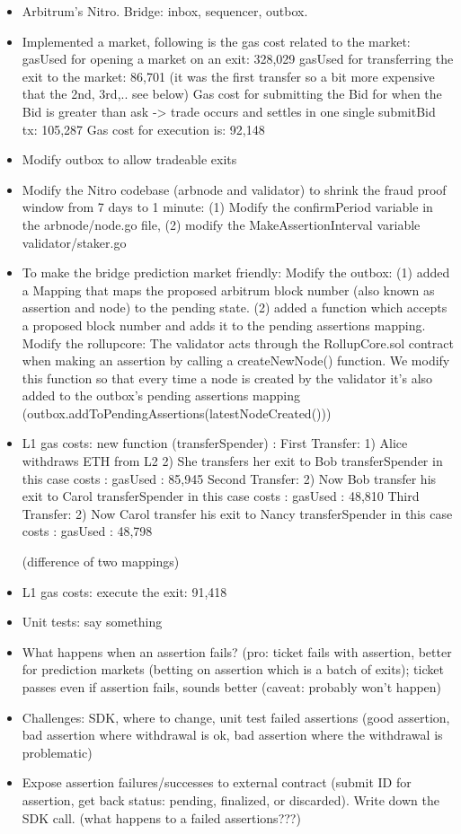 \begin{itemize}
\item Arbitrum's Nitro. Bridge: inbox, sequencer, outbox.
\item Implemented a market, following is the gas cost related to the market:
gasUsed for opening a market on an exit: 328,029
gasUsed for transferring the exit to the market:  86,701 (it was the first transfer so a bit more expensive that the 2nd, 3rd,.. see below)
Gas cost for submitting the Bid for when the Bid is greater than ask -> trade occurs and settles in one single submitBid tx:  105,287
Gas cost for execution is: 92,148
\item Modify outbox to allow tradeable exits
\item Modify the Nitro codebase (arbnode and validator) to shrink the fraud proof window from 7 days to 1 minute: (1) Modify the confirmPeriod variable in the arbnode/node.go file, (2) modify the MakeAssertionInterval variable validator/staker.go
\item To make the bridge prediction market friendly: 
Modify the outbox: (1) added a Mapping that maps the proposed arbitrum block number (also known as assertion and node) to the pending state. (2) added a function which accepts a proposed block number and adds it to the pending assertions mapping.
Modify the rollupcore: The validator acts through the RollupCore.sol contract when making an assertion by calling a createNewNode() function. We modify this function so that every time a node is created by the validator it's also added to the outbox's pending assertions mapping (outbox.addToPendingAssertions(latestNodeCreated()))

\item L1 gas costs: new function (transferSpender) : 
First Transfer: 
1) Alice withdraws ETH from L2
2) She transfers her exit to Bob
transferSpender in this case costs : gasUsed : 85,945
Second Transfer: 
2) Now Bob transfer his exit to Carol
transferSpender in this case costs : gasUsed : 48,810
Third Transfer:
2) Now Carol transfer his exit to Nancy
transferSpender in this case costs : gasUsed : 48,798

 (difference of two mappings)

\item L1 gas costs: execute the exit: 91,418

\item Unit tests: say something
\item What happens when an assertion fails? (pro: ticket fails with assertion, better for prediction markets (betting on assertion which is a batch of exits); ticket passes even if assertion fails, sounds better (caveat: probably won't happen)
\item Challenges: SDK, where to change, unit test failed assertions (good assertion, bad assertion where withdrawal is ok, bad assertion where the withdrawal is problematic)
\item Expose assertion failures/successes to external contract (submit ID for assertion, get back status: pending, finalized, or discarded). Write down the SDK call. (what happens to a failed assertions???)
\end{itemize}


